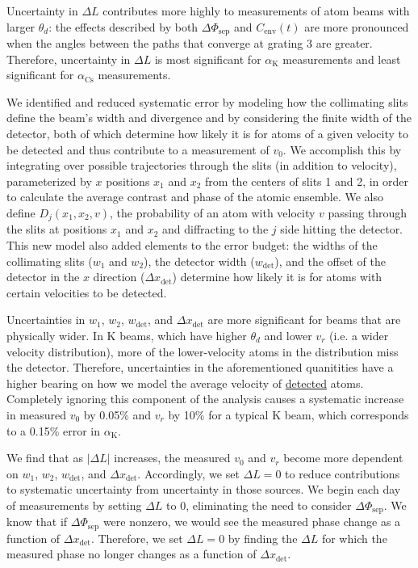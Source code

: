 \documentclass[twocolumn,prl,showpacs,superscriptaddress]{revtex4-1}   %
\newcommand{\ak}{\alpha_{\textrm{K}}}
\newcommand{\acs}{\alpha_{\textrm{Cs}}}
\newcommand{\dphisep}{\Delta\Phi_{\mathrm{sep}}}
\newcommand{\cenv}{C_{\mathrm{env}}}
\begin{document}
Uncertainty in $\Delta L$ contributes more highly to measurements of atom beams with larger $\theta_d$: the effects described by both $\dphisep$ and $\cenv(t)$ are more pronounced when the angles between the paths that converge at grating 3 are greater. Therefore, uncertainty in $\Delta L$ is most significant for $\ak$ measurements and least significant for $\acs$ measurements.

We identified and reduced systematic error by modeling how the collimating slits define the beam's width and divergence and by considering the finite width of the detector, both of which determine how likely it is for atoms of a given velocity to be detected and thus contribute to a measurement of $v_0$. 
We accomplish this by integrating over possible trajectories through the slits (in addition to velocity), parameterized by $x$ positions $x_1$ and $x_2$ from the centers of slits 1 and 2, in order to calculate the average contrast and phase of the atomic ensemble. We also define $D_j(x_1,x_2,v)$, the probability of an atom with velocity $v$ passing through the slits at positions $x_1$ and $x_2$ and diffracting to the $j$ side hitting the detector.
This new model also added elements to the error budget: the widths of the collimating slits ($w_1$ and $w_2$), the detector width ($w_{\mathrm{det}}$), and the offset of the detector in the $x$ direction ($\Delta x_{\mathrm{det}}$) determine how likely it is for atoms with certain velocities to be detected. 

Uncertainties in $w_1$, $w_2$, $w_{\mathrm{det}}$, and $\Delta x_{\mathrm{det}}$ are more significant for beams that are physically wider. 
In K beams, which have higher $\theta_d$ and lower $v_r$ (i.e. a wider velocity distribution), more of the lower-velocity atoms in the distribution miss the detector. Therefore, uncertainties in the aforementioned quanitities have a higher bearing on how we model the average velocity of \underline{detected} atoms.
Completely ignoring this component of the analysis causes a systematic increase in measured $v_0$ by 0.05\% and $v_r$ by 10\% for a typical K beam, which corresponds to a 0.15\% error in $\ak$.
 
We find that as $\left|\Delta L\right|$ increases, the measured $v_0$ and $v_r$ become more dependent on $w_1$, $w_2$, $w_{\mathrm{det}}$, and $\Delta x_{\mathrm{det}}$. Accordingly, we set $\Delta L = 0$ to reduce contributions to systematic uncertainty from uncertainty in those sources. We begin each day of measurements by setting $\Delta L$ to 0, eliminating the need to consider $\dphisep$. We know that if $\dphisep$ were nonzero, we would see the measured phase change as a function of $\Delta x_{\mathrm{det}}$. Therefore, we set $\Delta L = 0$ by finding the $\Delta L$ for which the measured phase no longer changes as a function of $\Delta x_{\mathrm{det}}$.
\end{document}

